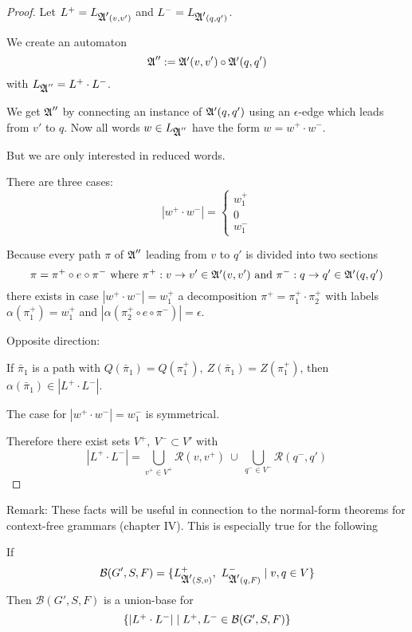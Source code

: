 \begin{proof}
Let $L^+ = L_{\mbox{$\mathfrak{A'}$}(v, v')}$ and $L^- = L_{\mbox{$\mathfrak{A'}$}(q, q')}$. 

We create an automaton
\[ \mbox{$\mathfrak{A}$}'' := \mbox{$\mathfrak{A'}$}(v, v') \circ \mbox{$\mathfrak{A'}$}(q, q') \]
with $L_{\mbox{$\mathfrak{A}$}''} = L^+ \cdot L^-$.

We get $\mbox{$\mathfrak{A}$}''$ by connecting an instance of $\mbox{$\mathfrak{A'}$}(q, q')$ using an
$\epsilon$-edge which leads from $v'$ to $q$. Now all words $w \in L_{\mbox{$\mathfrak{A}$}''}$
have the form $w = w^+ \cdot w^-$. 

But we are only interested in reduced words.

There are three cases:
\[ |w^+ \cdot w^-| = \begin{cases} w_1^+ \\ 0 \\ w_1^- \end{cases} \]

Because every path $\pi$ of $\mbox{$\mathfrak{A}$}''$ leading from $v$ to $q'$ is divided into
two sections
\[ \pi = \pi^+ \circ e \circ \pi^- \text{ where }\pi^+: v \to v' \in \mbox{$\mathfrak{A'}$}(v,
v')\text{ and }\pi^-: q \to q' \in \mbox{$\mathfrak{A'}$}(q, q') \]
there exists in case $|w^+ \cdot w^-| = w_1^+$ a decomposition $\pi^+ = \pi_1^+
\cdot \pi_2^+$ with labels $\alpha(\pi_1^+) = w_1^+$ and $|\alpha(\pi_2^+ \circ
e \circ \pi^-)| = \epsilon$.

\missingfigure

\bigskip
Opposite direction:

If $\bar{\pi}_1$ is a path with $Q(\bar{\pi}_1) = Q(\pi_1^+),\ Z(\bar{\pi}_1) =
Z(\pi_1^+)$, then $\alpha(\bar{\pi}_1) \in |L^+ \cdot L^-|$.

\medskip
The case for $|w^+ \cdot w^-| = w_1^-$ is symmetrical.

\bigskip
Therefore there exist sets $V^+,\ V^- \subset V'$ with
\[ |L^+ \cdot L^-| = \bigcup_{v^+ \in V^+} \mathcal{R}(v, v^+) \ \cup\ 
\bigcup_{q^- \in V^-} \mathcal{R}(q^-, q') \]
\end{proof}

Remark: These facts will be useful in connection to the normal-form
theorems for context-free grammars (chapter IV). This is especially true for the
following

\begin{corollary}
If 
\[ \mathcal{B}(G', S, F) = \mbox{$\{L^+_{\mbox{$\mathfrak{A'}$}(S, v)},\ L^-_{\mbox{$\mathfrak{A'}$}(q, F)}
\mid v, q \in V\}$} \]
Then $\mathcal{B}(G', S, F)$ is a union-base for
\[ \mbox{$\{|L^+ \cdot L^-| \mid L^+, L^- \in \mathcal{B}(G', S, F)\}$} \]
\end{corollary}

